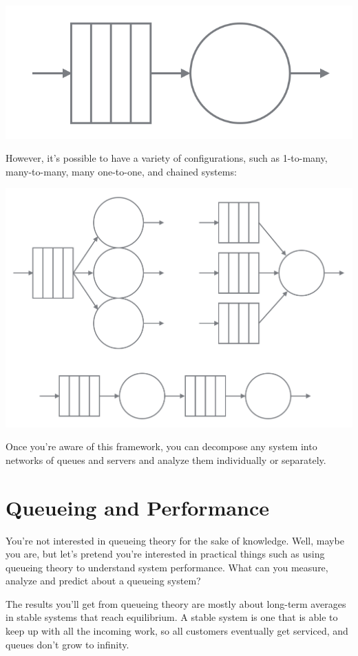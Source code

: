 \documentclass{vivid_layout_pdf}
\begin{document}
\begin{center}
\includegraphics[width=.375\linewidth]{queueing-theory/queue-and-server}
\end{center}

However, it's possible to have a variety of configurations, such as 1-to-many, many-to-many, many one-to-one, and chained systems:

\begin{center}
\includegraphics[width=.75\linewidth]{queueing-theory/queue-configurations}
\end{center}

Once you're aware of this framework, you can decompose any system into networks of queues and servers and analyze them individually or separately.

\section{Queueing and Performance}

You're not interested in queueing theory for the sake of knowledge. Well, maybe you are, but let's pretend you're interested in practical things such as using queueing theory to understand system performance. What can you measure, analyze and predict about a queueing system?

The results you'll get from queueing theory are mostly about long-term averages in stable systems that reach equilibrium. A stable system is one that is able to keep up with all the incoming work, so all customers eventually get serviced, and queues don't grow to infinity.
\end{document}
